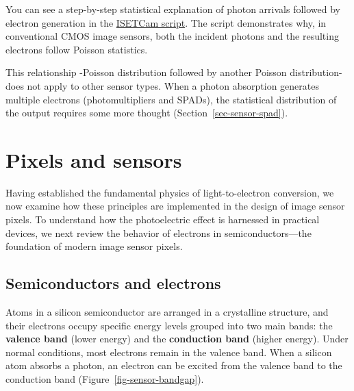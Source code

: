 \documentclass[
  letterpaper,
]{book}
\begin{document}
\begin{tcolorbox}[enhanced jigsaw, title=\textcolor{quarto-callout-note-color}{\faInfo}\hspace{0.5em}{ISETCam: shot noise}, colback=white, colframe=quarto-callout-note-color-frame, leftrule=.75mm, breakable, arc=.35mm, toptitle=1mm, left=2mm, colbacktitle=quarto-callout-note-color!10!white, toprule=.15mm, bottomrule=.15mm, coltitle=black, bottomtitle=1mm, titlerule=0mm, rightrule=.15mm, opacitybacktitle=0.6, opacityback=0]

You can see a step-by-step statistical explanation of photon arrivals
followed by electron generation in the
\href{../code/fise_photonsElectrons.html}{ISETCam script}. The script
demonstrates why, in conventional CMOS image sensors, both the incident
photons and the resulting electrons follow Poisson statistics.

This relationship -Poisson distribution followed by another Poisson
distribution- does not apply to other sensor types. When a photon
absorption generates multiple electrons (photomultipliers and SPADs),
the statistical distribution of the output requires some more thought
(Section~\ref{sec-sensor-spad}).

\end{tcolorbox}

\chapter{Pixels and sensors}\label{sec-pixels}

Having established the fundamental physics of light-to-electron
conversion, we now examine how these principles are implemented in the
design of image sensor pixels. To understand how the photoelectric
effect is harnessed in practical devices, we next review the behavior of
electrons in semiconductors---the foundation of modern image sensor
pixels.

\section{Semiconductors and electrons}\label{sec-semiconductor-physics}

Atoms in a silicon semiconductor are arranged in a crystalline
structure, and their electrons occupy specific energy levels grouped
into two main bands: the \textbf{valence band} (lower energy) and the
\textbf{conduction band} (higher energy). Under normal conditions, most
electrons remain in the valence band. When a silicon atom absorbs a
photon, an electron can be excited from the valence band to the
conduction band (Figure~\ref{fig-sensor-bandgap}).
\end{document}
